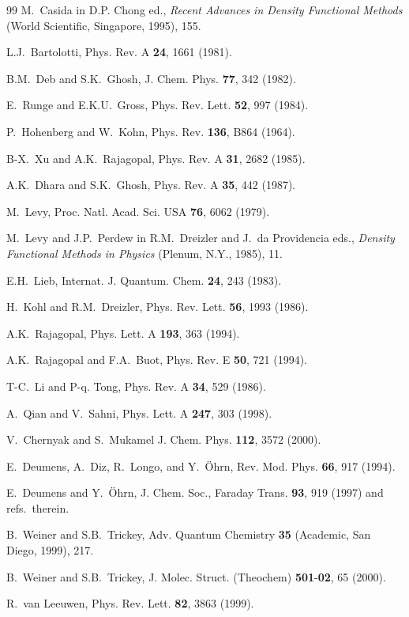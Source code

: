\documentclass[aps,preprint]{revtex4}%
\begin{document}
\begin{thebibliography}{99}
M.~Casida in D.P. Chong ed., \textit{Recent Advances in
Density Functional Methods} (World Scientific, Singapore, 1995), 155.

L.J.~Bartolotti, Phys. Rev. A \textbf{24}, 1661 (1981).

B.M.~Deb and S.K.~Ghosh, J. Chem. Phys. \textbf{77}, 342 (1982).

E.~Runge and E.K.U.~Gross, Phys. Rev. Lett. \textbf{52}, 997 (1984).

P.~Hohenberg and W.~Kohn, Phys. Rev. \textbf{136}, B864 (1964).

B-X.~Xu and A.K.~Rajagopal, Phys. Rev. A \textbf{31}, 2682 (1985).

A.K.~Dhara and S.K.~Ghosh, Phys. Rev. A \textbf{35}, 442 (1987).

M.~Levy, Proc. Natl. Acad. Sci. USA \textbf{76}, 6062 (1979).

M.~Levy and J.P.~Perdew in R.M.~Dreizler and J.~da
Providencia eds., \textit{Density Functional Methods in Physics} (Plenum,
N.Y., 1985), 11.

E.H.~Lieb, Internat. J. Quantum. Chem. \textbf{24}, 243 (1983).

H.~Kohl and R.M.~Dreizler, Phys. Rev. Lett. \textbf{56}, 1993 (1986).

A.K.~Rajagopal, Phys. Lett. A \textbf{193}, 363 (1994).

A.K.~Rajagopal and F.A.~Buot, Phys. Rev. E \textbf{50},
721 (1994).

T-C.~Li and P-q. Tong, Phys. Rev. A \textbf{34}, 529 (1986).

A.~Qian and V.~Sahni, Phys. Lett. A \textbf{247}, 303 (1998).

V.~Chernyak and S.~Mukamel J. Chem. Phys. \textbf{112},
3572 (2000).

E.~Deumens, A.~Diz, R.~Longo, and Y.~{\"O}hrn, Rev. Mod.
Phys. \textbf{66}, 917 (1994).

E.~Deumens and Y.~{\"O}hrn, J. Chem. Soc., Faraday Trans.
\textbf{93}, 919 (1997) and refs.~therein.

B.~Weiner and S.B.~Trickey, Adv. Quantum Chemistry
\textbf{35} (Academic, San Diego, 1999), 217.

B.~Weiner and S.B.~Trickey, J. Molec. Struct. (Theochem)
\textbf{501}-\textbf{02}, 65 (2000).

R.~van Leeuwen, Phys. Rev. Lett. \textbf{82}, 3863 (1999).
\end{thebibliography}
\end{document}
